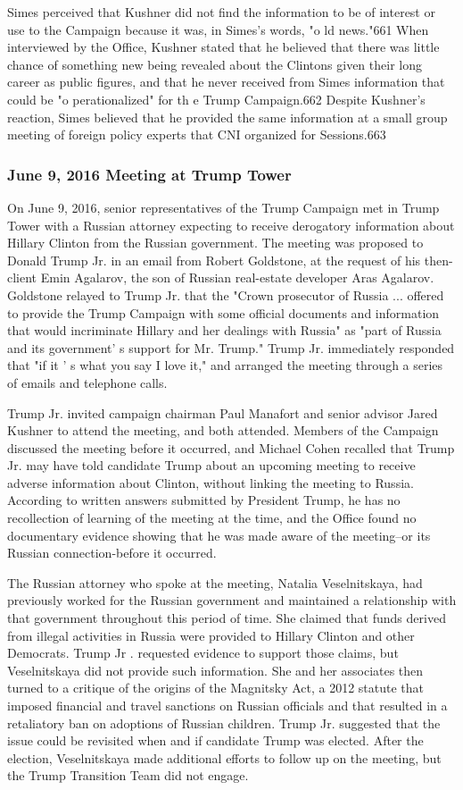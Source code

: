 Simes perceived that Kushner did not find the information to be of interest or use to the Campaign because it  was, in Simes's words, "o ld news."661 When interviewed by the Office, Kushner stated that he believed that there was little chance of something new being revealed about the Clintons given their long career as public figures, and that he never received from Simes information that could be "o perationalized" for th e  Trump Campaign.662 Despite Kushner's reaction, Simes believed that he provided the same information at a small group meeting of foreign policy experts that CNI organized for Sessions.663

\subsubsection{June 9, 2016 Meeting at Trump Tower}

On June 9, 2016, senior representatives of the Trump Campaign met in Trump Tower with a  Russian attorney expecting to receive derogatory information about Hillary Clinton from the Russian government. The meeting was proposed to Donald Trump Jr. in an email from Robert Goldstone, at the request of his then-client Emin Agalarov, the son of Russian real-estate developer Aras Agalarov.  Goldstone relayed to Trump Jr. that the "Crown prosecutor of Russia ... offered to provide the Trump Campaign with some official documents and information that would incriminate Hillary and her dealings with Russia" as "part of Russia and its government' s support for Mr. Trump." Trump Jr. immediately responded that "if it ' s what you say I love it," and arranged the meeting through a series of emails and telephone calls.

Trump Jr. invited campaign chairman Paul Manafort and senior advisor Jared Kushner to attend the meeting, and both attended. Members of the Campaign discussed the meeting before it occurred, and Michael Cohen recalled that Trump Jr. may have told candidate Trump about an upcoming meeting to receive adverse information about Clinton, without linking the meeting to Russia. According to written answers submitted by President Trump, he has no recollection of learning of the meeting at the time, and the Office found no documentary evidence showing that he was made aware of the meeting--or its Russian connection-before it occurred.

The Russian attorney who spoke at the meeting, Natalia Veselnitskaya, had previously worked for the Russian government and maintained a relationship with that government throughout this period of time. She claimed that funds derived from illegal activities in Russia were provided to Hillary Clinton and other Democrats. Trump Jr . requested evidence to support those claims, but Veselnitskaya did not provide such information. She and her associates then turned to a critique of the origins of the Magnitsky Act, a  2012 statute that imposed financial and travel sanctions on Russian officials and that resulted in a retaliatory ban on adoptions of Russian children. Trump Jr. suggested that the issue could be revisited when and if  candidate Trump was elected.  After the election,  Veselnitskaya made additional efforts to follow up on the meeting, but the Trump Transition Team did not engage.

